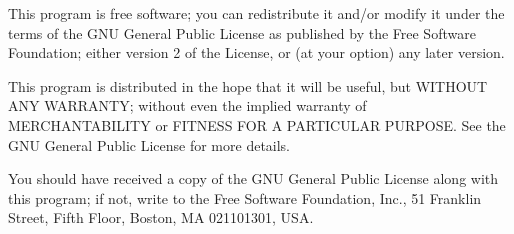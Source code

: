 \documentclass[letterpaper,10pt,english]{sphinxmanual}
\begin{document}
\sphinxAtStartPar
This program is free software; you can redistribute it and/or
modify it under the terms of the GNU General Public License
as published by the Free Software Foundation; either version 2
of the License, or (at your option) any later version.

\sphinxAtStartPar
This program is distributed in the hope that it will be useful,
but WITHOUT ANY WARRANTY; without even the implied warranty of
MERCHANTABILITY or FITNESS FOR A PARTICULAR PURPOSE.  See the
GNU General Public License for more details.

\sphinxAtStartPar
You should have received a copy of the GNU General Public License
along with this program; if not, write to the Free Software
Foundation, Inc., 51 Franklin Street, Fifth Floor, Boston, MA  02110\sphinxhyphen{}1301, USA.
\end{document}
